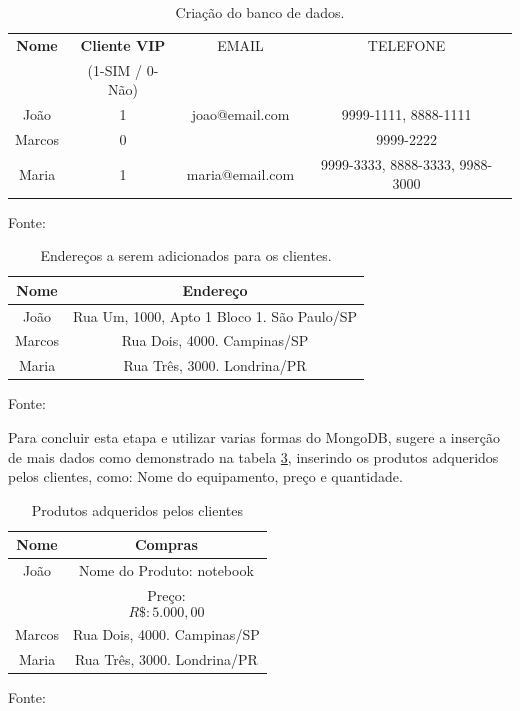 \begin{table}[H]
\center
  \caption{Criação do banco de dados.}
  \begin{tabular}{ | c | c  | c | c |}
      \hline
      \textbf{Nome} & \textbf{Cliente VIP} & EMAIL & TELEFONE \\
          & (1-SIM / 0-Não)  &  &    \\
      \hline
          João & 1 & joao@email.com & 9999-1111, 8888-1111 \\
      \hline
          Marcos & 0 &  & 9999-2222 \\
      \hline
          Maria & 1 &maria@email.com & 9999-3333, 8888-3333, 9988-3000 \\
      \hline
  \end{tabular}
  \label{tab:banco}
  \flushleft %

  {\fontsize{10pt}{\baselineskip}\selectfont
    Fonte: }
\end{table}
\begin{table}[H]
  \caption{Endereços a serem adicionados para os clientes.}
  \center
  \begin{tabular}{ | c | c |}
      \hline
      \textbf{Nome} & \textbf{Endereço} \\
      \hline
          João & Rua Um, 1000, Apto 1 Bloco 1. São Paulo/SP \\
      \hline
          Marcos & Rua Dois, 4000. Campinas/SP \\
      \hline
          Maria & Rua Três, 3000. Londrina/PR \\
      \hline
  \end{tabular}
  \label{tab:end}
  \flushleft %

  {\fontsize{10pt}{\baselineskip}\selectfont
    Fonte: }
\end{table}
\par Para concluir esta etapa e utilizar varias formas do MongoDB, sugere a inserção de mais dados como demonstrado na tabela \ref{tab:com}, inserindo os produtos adqueridos pelos clientes, como: Nome do equipamento, preço e quantidade.

\begin{table}[H]
  \caption{Produtos adqueridos pelos clientes}
  \center
  \begin{tabular}{ | c | c |}
      \hline
      \textbf{Nome} & \textbf{Compras} \\
      \hline
          João & Nome do Produto: notebook \\
          & Preço: $$R\$:5.000,00 $$ \\
      \hline
          Marcos & Rua Dois, 4000. Campinas/SP \\
      \hline
          Maria & Rua Três, 3000. Londrina/PR \\
      \hline
  \end{tabular}
  \label{tab:com}
  \flushleft %

  {\fontsize{10pt}{\baselineskip}\selectfont
    Fonte: }
\end{table}

